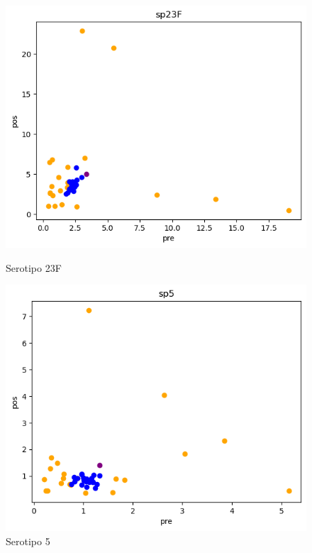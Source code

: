 \begin{figure}
    \begin{minipage}{0.45\textwidth}
        \centering
        \includegraphics[width=\linewidth]{Graphics/sp23ft.png}
        \caption{Serotipo 23F}
        \label{fig:sp23ft}
    \end{minipage}
    \begin{minipage}{0.45\textwidth}
        \centering
        \includegraphics[width=\linewidth]{Graphics/sp5t.png}
        \caption{Serotipo 5}
        \label{fig:sp5t}
    \end{minipage}
\end{figure}
